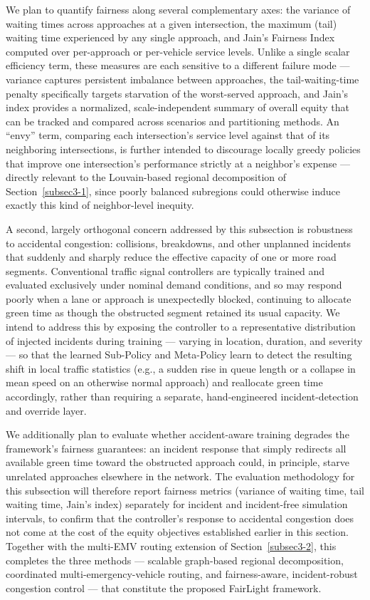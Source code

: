 \documentclass[3p,times]{elsarticle}
\theoremstyle{plain}
\theoremstyle{definition}
\begin{document}
We plan to quantify fairness along several complementary axes: the
variance of waiting times across approaches at a given intersection,
the maximum (tail) waiting time experienced by any single approach,
and Jain's Fairness Index computed over per-approach or per-vehicle
service levels. Unlike a single scalar efficiency term, these measures
are each sensitive to a different failure mode --- variance captures
persistent imbalance between approaches, the tail-waiting-time penalty
specifically targets starvation of the worst-served approach, and
Jain's index provides a normalized, scale-independent summary of
overall equity that can be tracked and compared across scenarios and
partitioning methods. An ``envy'' term, comparing each intersection's
service level against that of its neighboring intersections, is
further intended to discourage locally greedy policies that improve
one intersection's performance strictly at a neighbor's expense ---
directly relevant to the Louvain-based regional decomposition of
Section~\ref{subsec3-1}, since poorly balanced subregions could
otherwise induce exactly this kind of neighbor-level inequity.

A second, largely orthogonal concern addressed by this subsection is
robustness to accidental congestion: collisions, breakdowns,
and other unplanned incidents that suddenly and sharply reduce the
effective capacity of one or more road segments. Conventional traffic
signal controllers are typically trained and evaluated exclusively
under nominal demand conditions, and so may respond poorly when a
lane or approach is unexpectedly blocked, continuing to allocate green
time as though the obstructed segment retained its usual capacity. We
intend to address this by exposing the controller to a representative
distribution of injected incidents during training --- varying in
location, duration, and severity --- so that the learned Sub-Policy
and Meta-Policy learn to detect the resulting shift in local traffic
statistics (e.g., a sudden rise in queue length or a collapse in mean
speed on an otherwise normal approach) and reallocate green time
accordingly, rather than requiring a separate, hand-engineered
incident-detection and override layer.

We additionally plan to evaluate whether accident-aware training
degrades the framework's fairness guarantees: an incident response
that simply redirects all available green time toward the obstructed
approach could, in principle, starve unrelated approaches elsewhere in
the network. The evaluation methodology for this subsection will
therefore report fairness metrics (variance of waiting time, tail
waiting time, Jain's index) separately for incident and incident-free
simulation intervals, to confirm that the controller's response to
accidental congestion does not come at the cost of the equity
objectives established earlier in this section. Together with the
multi-EMV routing extension of Section~\ref{subsec3-2}, this
completes the three methods --- scalable graph-based regional
decomposition, coordinated multi-emergency-vehicle routing, and
fairness-aware, incident-robust congestion control --- that constitute
the proposed FairLight framework.
\end{document}
